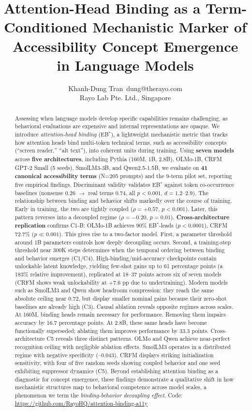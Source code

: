\documentclass[10pt]{article} %
\title{Attention-Head Binding as a Term-Conditioned Mechanistic Marker of Accessibility Concept Emergence in Language Models}
\author{\name Khanh-Dung Tran\,\orcidlink{0009-0000-0614-2454} \email dung@therayo.com \\
      \addr Rayo Lab Pte. Ltd., Singapore}
\begin{document}
\maketitle

\begin{abstract}
Assessing when language models develop specific capabilities remains challenging, as behavioral evaluations are expensive and internal representations are opaque.
We introduce \emph{attention-head binding} (EB$^*$), a lightweight mechanistic metric that tracks how attention heads bind multi-token technical terms, such as accessibility concepts (``screen reader,'' ``alt text''), into coherent units during training.
Using \textbf{seven models} across \textbf{five architectures}, including Pythia (160M, 1B, 2.8B), OLMo-1B, CRFM GPT-2 Small (5 seeds), SmolLM3-3B, and Qwen2.5-1.5B, we evaluate on \textbf{41 canonical accessibility terms} (N=205 prompts) and the 9-term pilot set, reporting five empirical findings.
Discriminant validity validates EB$^*$ against token co-occurrence baselines (nonsense 0.26 $\to$ real terms 0.74, all $p<0.001$, $d=1.2$--$2.9$).
The relationship between binding and behavior shifts markedly over the course of training. Early in training, the two are tightly coupled ($\rho=+0.57$, $p<0.001$). Later, this pattern reverses into a decoupled regime ($\rho=-0.20$, $p=0.01$).
\textbf{Cross-architecture replication} confirms C1-B: OLMo-1B achieves 90\% EB$^*$-leads ($p<0.0001$), CRFM 72.7\% ($p \ll 0.001$).
This gives rise to a two-factor model. First, a parameter threshold around 1B parameters controls how deeply decoupling occurs. Second, a training-step threshold near 300K steps determines when the temporal ordering between binding and behavior emerges (C1/C4).
High-binding/mid-accuracy checkpoints contain unlockable latent knowledge, yielding few-shot gains up to 61 percentage points (a 183\% relative improvement), replicated at 18--37 points across six of seven models (CRFM shows weak unlockability at +7.6 pp due to undertraining). Modern models such as SmolLM3 and Qwen show headroom compression: they reach the same absolute ceiling near 0.72, but display smaller nominal gains because their zero-shot baselines are already high (C3).
Causal ablation reveals opposite regimes across scales. At 160M, binding heads remain necessary for performance. Removing them impairs accuracy by 16.7 percentage points. At 2.8B, these same heads have become functionally superseded; ablating them improves performance by 33.3 points.
Cross-architecture C5 reveals three distinct patterns. OLMo and Qwen achieve near-perfect recognition ceiling with negligible ablation effects. SmolLM3 operates in a distributed regime with negative specificity (--0.043). CRFM displays striking initialization sensitivity, with four of five random seeds showing coupled behavior and one seed exhibiting suppressor dynamics (C5).
Beyond establishing attention binding as a diagnostic for concept emergence, these findings demonstrate a qualitative shift in how mechanistic structures map to behavioral competence across model scales, a phenomenon we term the \emph{binding-behavior decoupling effect}.
Code: \url{https://github.com/RayoHQ/attention-binding-a11y}
\end{abstract}
\end{document}
